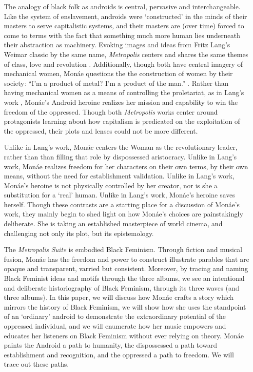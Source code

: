 \documentclass[a4paper, 11pt]{article} %
\begin{document}
The analogy of black folk as androids is central, pervasive and interchangeable. 
Like the system of enslavement, androids were `constructed' in the minds of their masters to serve capitalistic systems, and their masters are (over time) forced to come to terms with the fact that something much more human lies underneath their abstraction as machinery.
Evoking images and ideas from Fritz Lang's Weimar classic by the same name, \emph{Metropolis} centers and shares the same themes of class, love and revolution \cite{metropolis}.
Additionally, though both have central imagery of mechanical women, Mon\'ae questions the the construction of women by their society: ``I'm a product of metal? I'm a product of the man.'' \cite{happyhunting}. 
Rather than having mechanical women as a means of controlling the proletariat, as in Lang's work \cite{metropolis}, Mon\'ae's Android heroine realizes her mission and capability to win the freedom of the oppressed.
Though both \emph{Metropolis} works center around protagonists learning about how capitalism is predicated on the exploitation of the oppressed, their plots and lenses could not be more different.

Unlike in Lang's work, Mon\'ae centers the Woman as the revolutionary leader, rather than than filling that role by dispossessed aristocracy.
Unlike in Lang's work, Mon\'ae realizes freedom for her characters on their own terms, by their own means, without the need for establishment validation.
Unlike in Lang's work, Mon\'ae's heroine is not physically controlled by her creator, nor is she a substitution for a `real' human.
Unlike in Lang's work, Mon\'ae's heroine saves herself.
Though these contrasts are a starting place for a discussion of Mon\'ae's work, they mainly begin to shed light on how Mon\'ae's choices are painstakingly deliberate.
She is taking an established masterpiece of world cinema, and challenging not only its plot, but its epistemology.

The \emph{Metropolis Suite} is embodied Black Feminism.
Through fiction and musical fusion, Mon\'ae has the freedom and power to construct illustrate parables that are opaque and transparent, varried but consistent.
Moreover, by tracing and naming Black Feminist ideas and motifs through the three albums, we see an intentional and deliberate historiography of Black Feminism, through its three waves (and three albums).
In this paper, we will discuss how Mon\'ae crafts a story which mirrors the history of Black Feminism, we will show how she uses the standpoint of an `ordinary' android to demonstrate the extraordinary potential of the oppressed individual, and we will enumerate how her music empowers and educates her listeners on Black Feminism without ever relying on theory.
Mon\'ae paints the Android a path to humanity, the dispossessed a path toward establishment and recognition, and the oppressed a path to freedom.
We will trace out these paths. 
\end{document}
